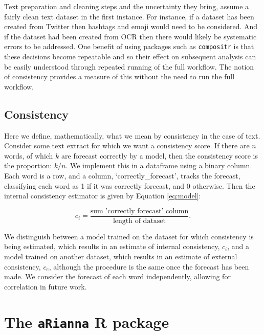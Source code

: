 \documentclass[11pt,]{article}
\begin{document}
Text preparation and cleaning steps and the uncertainty they bring, assume a fairly clean text dataset in the first instance. For instance, if a dataset has been created from Twitter then hashtags and emoji would need to be considered. And if the dataset had been created from OCR then there would likely be systematic errors to be addressed. One benefit of using packages such as \texttt{compositr} is that these decisions become repeatable and so their effect on subsequent analysis can be easily understood through repeated running of the full workflow. The notion of consistency provides a measure of this without the need to run the full workflow.

\hypertarget{consistency}{%
\subsection{Consistency}\label{consistency}}

Here we define, mathematically, what we mean by consistency in the case of text. Consider some text extract for which we want a consistency score. If there are \(n\) words, of which \(k\) are forecast correctly by a model, then the consistency score is the proportion: \(k/n\). We implement this in a dataframe using a binary column. Each word is a row, and a column, `correctly\_forecast', tracks the forecast, classifying each word as 1 if it was correctly forecast, and 0 otherwise. Then the internal consistency estimator is given by Equation \eqref{eq:model}:

\begin{equation} 
\label{eq:model}
c_i = \frac{\mbox{sum 'correctly_forecast' column}}{\mbox{length of dataset}}. 
\end{equation}

We distinguish between a model trained on the dataset for which consistency is being estimated, which results in an estimate of internal consistency, \(c_i\), and a model trained on another dataset, which results in an estimate of external consistency, \(c_e\), although the procedure is the same once the forecast has been made. We consider the forecast of each word independently, allowing for correlation in future work.

\hypertarget{arianna}{%
\section{\texorpdfstring{The \texttt{aRianna} R package}{The aRianna R package}}\label{arianna}}
\end{document}
